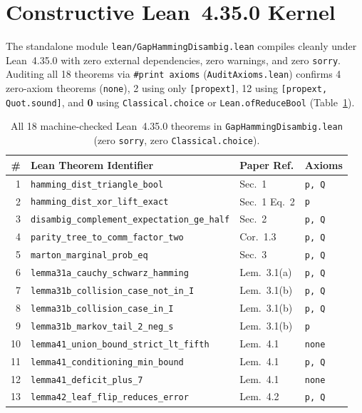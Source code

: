 \documentclass[10pt,twocolumn]{article}
\begin{document}
\section{Constructive Lean~4.35.0 Kernel}\label{sec:lean}
The standalone module \texttt{lean/GapHammingDisambig.lean} compiles cleanly under Lean~4.35.0 with zero external dependencies, zero warnings, and zero \texttt{sorry}. Auditing all 18 theorems via \texttt{\#print axioms} (\texttt{AuditAxioms.lean}) confirms 4 zero-axiom theorems (\texttt{none}), 2 using only \texttt{[propext]}, 12 using \texttt{[propext, Quot.sound]}, and \textbf{0} using \texttt{Classical.choice} or \texttt{Lean.ofReduceBool} (Table~\ref{tab:lean}).

\begin{table}[t]
\centering
\caption{All 18 machine-checked Lean~4.35.0 theorems in \texttt{GapHammingDisambig.lean} (zero \texttt{sorry}, zero \texttt{Classical.choice}).}
\label{tab:lean}
\scriptsize
\setlength{\tabcolsep}{3.0pt}
\begin{tabular}{@{}rlll@{}}
\toprule
\# & Lean Theorem Identifier & Paper Ref. & Axioms \\
\midrule
1 & \texttt{hamming\_dist\_triangle\_bool} & Sec.~1 & \texttt{p, Q} \\
2 & \texttt{hamming\_dist\_xor\_lift\_exact} & Sec.~1 Eq.~2 & \texttt{p} \\
3 & \texttt{disambig\_complement\_expectation\_ge\_half} & Sec.~2 & \texttt{p, Q} \\
4 & \texttt{parity\_tree\_to\_comm\_factor\_two} & Cor.~1.3 & \texttt{p, Q} \\
5 & \texttt{marton\_marginal\_prob\_eq} & Sec.~3 & \texttt{p, Q} \\
6 & \texttt{lemma31a\_cauchy\_schwarz\_hamming} & Lem.~3.1(a) & \texttt{p, Q} \\
7 & \texttt{lemma31b\_collision\_case\_not\_in\_I} & Lem.~3.1(b) & \texttt{p, Q} \\
8 & \texttt{lemma31b\_collision\_case\_in\_I} & Lem.~3.1(b) & \texttt{p, Q} \\
9 & \texttt{lemma31b\_markov\_tail\_2\_neg\_s} & Lem.~3.1(b) & \texttt{p} \\
10 & \texttt{lemma41\_union\_bound\_strict\_lt\_fifth} & Lem.~4.1 & \texttt{none} \\
11 & \texttt{lemma41\_conditioning\_min\_bound} & Lem.~4.1 & \texttt{p, Q} \\
12 & \texttt{lemma41\_deficit\_plus\_7} & Lem.~4.1 & \texttt{none} \\
13 & \texttt{lemma42\_leaf\_flip\_reduces\_error} & Lem.~4.2 & \texttt{p, Q} \\

\end{tabular}
\end{table}
\end{document}
